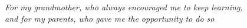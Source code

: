 \null\vfill
\begin{center}
\textsl{For my grandmother, who always encouraged me to keep learning,\\
and for my parents, who gave me the opportunity to do so}
\end{center}
\vfill
